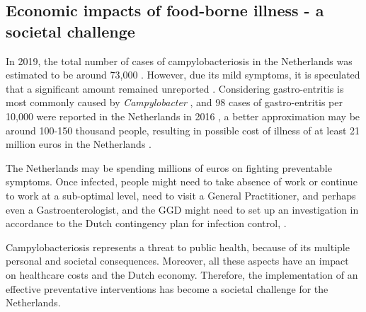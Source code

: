 \subsection*{Economic impacts of food-borne illness - a societal challenge}


In 2019, the total number of cases of campylobacteriosis in the Netherlands was estimated to be around 73,000 \parencite{lagerweij_disease_2020}. However, due its mild symptoms, it is speculated that a significant amount remained unreported \parencite{koutsoumanis_update_2020}. Considering gastro-entritis is most commonly caused by \textit{Campylobacter} \parencite{fouts_major_2005}, and 98 cases of gastro-entritis per 10,000 were reported in the Netherlands in 2016 \parencite{van_pelt_jaarraport_2016}, a better approximation may be around 100-150 thousand people, resulting in possible cost of illness of at least 21 million euros in the Netherlands \parencite{havelaar_costs_2005}.

The Netherlands may be spending millions of euros on fighting preventable symptoms. Once infected, people might need to take absence of work or continue to work at a sub-optimal level, need to visit a General Practitioner, and perhaps even a Gastroenterologist, and the GGD might need to set up an investigation in accordance to the Dutch contingency plan for infection control, . 

Campylobacteriosis represents a threat to public health, because of its multiple personal and societal consequences. Moreover, all these aspects have an impact on healthcare costs and the Dutch economy. Therefore, the implementation of an effective preventative interventions has become a societal challenge for the Netherlands.




